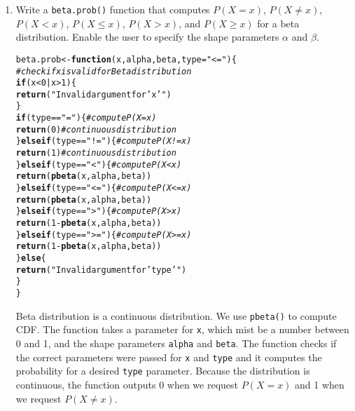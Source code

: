 \documentclass{article}\usepackage[]{graphicx}\usepackage[]{xcolor}
\makeatletter
\newcommand{\hlnum}[1]{\textcolor[rgb]{0.686,0.059,0.569}{#1}}%
\newcommand{\hlsng}[1]{\textcolor[rgb]{0.192,0.494,0.8}{#1}}%
\newcommand{\hlcom}[1]{\textcolor[rgb]{0.678,0.584,0.686}{\textit{#1}}}%
\newcommand{\hlopt}[1]{\textcolor[rgb]{0,0,0}{#1}}%
\newcommand{\hldef}[1]{\textcolor[rgb]{0.345,0.345,0.345}{#1}}%
\newcommand{\hlkwa}[1]{\textcolor[rgb]{0.161,0.373,0.58}{\textbf{#1}}}%
\newcommand{\hlkwb}[1]{\textcolor[rgb]{0.69,0.353,0.396}{#1}}%
\newcommand{\hlkwc}[1]{\textcolor[rgb]{0.333,0.667,0.333}{#1}}%
\newcommand{\hlkwd}[1]{\textcolor[rgb]{0.737,0.353,0.396}{\textbf{#1}}}%
\newenvironment{kframe}{%
 \def\at@end@of@kframe{}%
 \ifinner\ifhmode%
  \def\at@end@of@kframe{\end{minipage}}%
  \begin{minipage}{\columnwidth}%
 \fi\fi%
 \def\FrameCommand##1{\hskip\@totalleftmargin \hskip-\fboxsep
 \colorbox{shadecolor}{##1}\hskip-\fboxsep
     \hskip-\linewidth \hskip-\@totalleftmargin \hskip\columnwidth}%
 \MakeFramed {\advance\hsize-\width
   \@totalleftmargin\z@ \linewidth\hsize
   \@setminipage}}%
 {\par\unskip\endMakeFramed%
 \at@end@of@kframe}
\newenvironment{knitrout}{}{} %
\makeatother
\begin{document}
\begin{enumerate}
    \item Write a \texttt{beta.prob()} function that computes $P(X=x)$, 
    $P(X \neq x)$, $P(X<x)$, $P(X \leq x)$, $P(X > x)$, and $P(X \geq x)$
    for a beta distribution. Enable the user to specify the shape parameters
    $\alpha$ and $\beta$.
\begin{knitrout}\scriptsize
{}\color{fgcolor}\begin{kframe}
\begin{alltt}
\hldef{beta.prob} \hlkwb{<-} \hlkwa{function}\hldef{(}\hlkwc{x}\hldef{,} \hlkwc{alpha}\hldef{,} \hlkwc{beta}\hldef{,} \hlkwc{type}\hldef{=}\hlsng{"<="}\hldef{)\{}
  \hlcom{#check if x is valid for Beta distribution}
  \hlkwa{if} \hldef{(x}\hlopt{<}\hlnum{0} \hlopt{|} \hldef{x}\hlopt{>}\hlnum{1}\hldef{)\{}
    \hlkwd{return}\hldef{(}\hlsng{"Invalid argument for 'x'"}\hldef{)}
  \hldef{\}}
  \hlkwa{if} \hldef{(type} \hlopt{==} \hlsng{"="}\hldef{)\{} \hlcom{#compute P(X=x)}
    \hlkwd{return}\hldef{(}\hlnum{0}\hldef{)} \hlcom{#continuous distribution}
  \hldef{\}}\hlkwa{else if}\hldef{(type} \hlopt{==} \hlsng{"!="}\hldef{)\{}  \hlcom{#compute P(X!=x)}
    \hlkwd{return}\hldef{(}\hlnum{1}\hldef{)} \hlcom{#continuous distribution}
  \hldef{\}}\hlkwa{else if}\hldef{(type} \hlopt{==} \hlsng{"<"}\hldef{)\{}  \hlcom{#compute P(X<x)}
    \hlkwd{return}\hldef{(}\hlkwd{pbeta}\hldef{(x, alpha, beta))}
  \hldef{\}}\hlkwa{else if}\hldef{(type} \hlopt{==} \hlsng{"<="}\hldef{)\{} \hlcom{#compute P(X<=x)}
    \hlkwd{return}\hldef{(}\hlkwd{pbeta}\hldef{(x, alpha, beta))}
  \hldef{\}}\hlkwa{else if}\hldef{(type} \hlopt{==} \hlsng{">"}\hldef{)\{}  \hlcom{#compute P(X>x)}
    \hlkwd{return}\hldef{(}\hlnum{1} \hlopt{-} \hlkwd{pbeta}\hldef{(x, alpha, beta))}
  \hldef{\}}\hlkwa{else if} \hldef{(type} \hlopt{==} \hlsng{">="}\hldef{)\{}  \hlcom{#compute P(X>=x)}
    \hlkwd{return}\hldef{(}\hlnum{1} \hlopt{-} \hlkwd{pbeta}\hldef{(x, alpha, beta))}
  \hldef{\}}\hlkwa{else}\hldef{\{}
    \hlkwd{return}\hldef{(}\hlsng{"Invalid argument for 'type'"}\hldef{)}
  \hldef{\}}
\hldef{\}}
\end{alltt}
\end{kframe}
\end{knitrout}
Beta distribution is a continuous distribution. We use \texttt{pbeta()} to compute CDF. The function takes a parameter for \texttt{x}, which mist be a number between 0 and 1, and the shape parameters \texttt{alpha} and \texttt{beta}. The function checks if the correct parameters were passed for \texttt{x} and \texttt{type} and it computes the probability for a desired \texttt{type} parameter. Because the distribution is continuous, the function outputs 0 when we request $P(X=x)$ and 1 when we request $P(X \neq x)$.
\end{enumerate}

\end{document}
